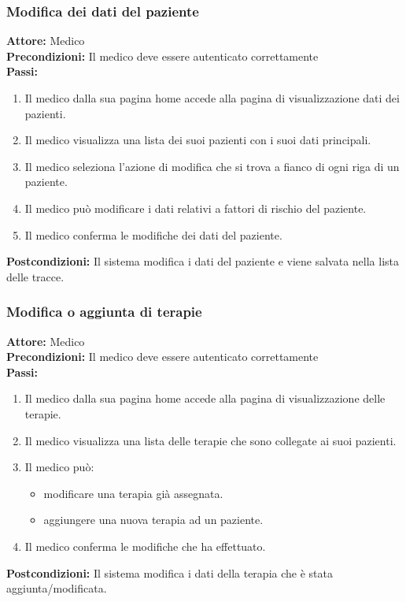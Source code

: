\documentclass{article}
\begin{document}
\subsubsection{Modifica dei dati del paziente}
\begin{mdframed}
   \textbf{Attore:} Medico \\
   \textbf{Precondizioni:} Il medico deve essere autenticato correttamente \\
   \textbf{Passi:}
   \begin{enumerate}
       \item Il medico dalla sua pagina home accede alla pagina di visualizzazione dati dei pazienti.
       \item Il medico visualizza una lista dei suoi pazienti con i suoi dati principali.
       \item Il medico seleziona l'azione di modifica che si trova a fianco di ogni riga di un paziente.
       \item Il medico può modificare i dati relativi a fattori di rischio del paziente.
       \item Il medico conferma le modifiche dei dati del paziente.
   \end{enumerate}
   \textbf{Postcondizioni:} Il sistema modifica i dati del paziente e viene salvata nella lista delle tracce.
\end{mdframed}

\subsubsection{Modifica o aggiunta di terapie}
\begin{mdframed}
   \textbf{Attore:} Medico \\
   \textbf{Precondizioni:} Il medico deve essere autenticato correttamente \\
   \textbf{Passi:}
   \begin{enumerate}
       \item Il medico dalla sua pagina home accede alla pagina di visualizzazione delle terapie.
       \item Il medico visualizza una lista delle terapie che sono collegate ai suoi pazienti.
       \item Il medico può:
       \begin{itemize}
           \item modificare una terapia già assegnata.
           \item aggiungere una nuova terapia ad un paziente.
       \end{itemize}
       \item Il medico conferma le modifiche che ha effettuato.
   \end{enumerate}
   \textbf{Postcondizioni:} Il sistema modifica i dati della terapia che è stata aggiunta/modificata.
\end{mdframed}
\end{document}
